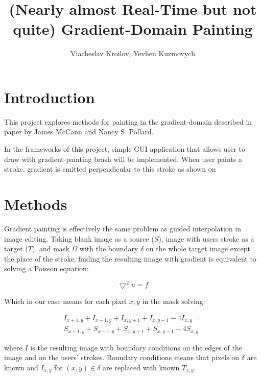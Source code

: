 \documentclass[hidelinks, english]{report}
\title{(Nearly almost Real-Time but not quite) Gradient-Domain Painting}
\author{Viacheslav Kroilov, Yevhen Kuzmovych}
\affiliation{ČVUT - FIT}
\begin{document}
\maketitle

\section{Introduction}

This project explores methods for painting in the gradient-domain described in paper by James McCann and
Nancy S. Pollard\cite{gradient}.

In the frameworks of this project, simple GUI application that allows user to draw with gradient-painting brash will
be implemented. When user paints a stroke, gradient is emitted perpendicular to this stroke as shown on


\section{Methods}
Gradient painting is effectively the same problem as guided interpolation in image editing. Taking blank image as a
source ($S$), image with users stroke as a target ($T$), and mask $\Omega$ with the boundary $\delta$ on the whole
target image except the place of the stroke, finding the resulting image with gradient is equivalent to solving
a Poisson equation:

\begin{equation}
    \bigtriangledown^2 u = f
\end{equation}

Which in our case means for each pixel $x,y$ in the mask solving:

\begin{equation}
    \begin{multlined}
        I_{x+1,y} + I_{x-1,y} + I_{x,y+1} + I_{x,y-1} - 4I_{x,y} = \\
        S_{x+1,y} + S_{x-1,y} + S_{x,y+1} + S_{x,y-1} - 4S_{x,y}
    \end{multlined}
    \label{eq:poisson}
\end{equation}

where $I$ is the resulting image with boundary conditions on the edges of the image and on the users' strokes. Boundary
conditions means that pixels on $\delta$ are known and $I_{x,y}$ for $ (x,y) \in \delta$ are replaced with
known $T_{x,y}$.
\end{document}
